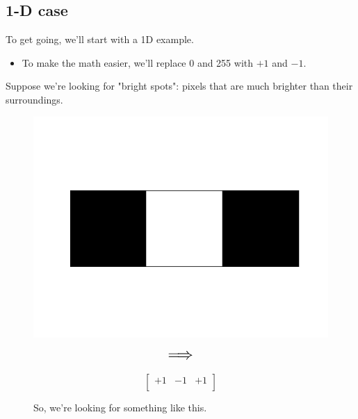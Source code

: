     \subsection{1-D case}

        To get going, we'll start with a 1D example.

        \begin{itemize}
            \item To make the math easier, we'll replace 0 and 255 with $+1$ and $-1$.
        \end{itemize}

        Suppose we're looking for "bright spots": pixels that are much brighter than their surroundings.


        \begin{figure}[ht]
            \begin{minipage}{.35\textwidth}
              \centering
              \includegraphics[width=.9\linewidth]{images/convolutional_neural_networks_images/1d_filter.png} 
            \end{minipage}
            \begin{minipage}{.3\textwidth}
                \centering
                $$\mathlarger{\mathlarger{\mathlarger{\implies}}}$$
            \end{minipage}
            \begin{minipage}{.1\textwidth}
                \centering
              \[
              \begin{bmatrix}
                  +1 & -1 & +1 \\
              \end{bmatrix}
              \]
            \end{minipage}
            \caption*{So, we're looking for something like this.}
        \end{figure}

